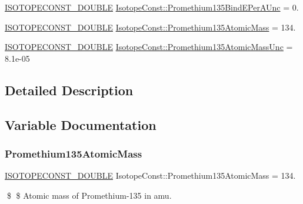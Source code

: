 \begin{DoxyCompactItemize}
\item 
\mbox{\hyperlink{group___isotope_const-_macros_ga8f45a7272ce02c0b4c65c44636ed719a}{I\+S\+O\+T\+O\+P\+E\+C\+O\+N\+S\+T\+\_\+\+D\+O\+U\+B\+LE}} \mbox{\hyperlink{group___isotope_const-_promethium-_pm135_gac7d0a56333d6a231e958581e6ab3c596}{Isotope\+Const\+::\+Promethium135\+Bind\+E\+Per\+A\+Unc}} = 0.
\item 
\mbox{\hyperlink{group___isotope_const-_macros_ga8f45a7272ce02c0b4c65c44636ed719a}{I\+S\+O\+T\+O\+P\+E\+C\+O\+N\+S\+T\+\_\+\+D\+O\+U\+B\+LE}} \mbox{\hyperlink{group___isotope_const-_promethium-_pm135_ga32e473388991b5d81122fc62445d90c1}{Isotope\+Const\+::\+Promethium135\+Atomic\+Mass}} = 134.
\item 
\mbox{\hyperlink{group___isotope_const-_macros_ga8f45a7272ce02c0b4c65c44636ed719a}{I\+S\+O\+T\+O\+P\+E\+C\+O\+N\+S\+T\+\_\+\+D\+O\+U\+B\+LE}} \mbox{\hyperlink{group___isotope_const-_promethium-_pm135_ga6296abb5a596edb933f86e9559ef9a0c}{Isotope\+Const\+::\+Promethium135\+Atomic\+Mass\+Unc}} = 8.\+1e-\/05
\end{DoxyCompactItemize}


\subsection{Detailed Description}


\subsection{Variable Documentation}
\mbox{\label{group___isotope_const-_promethium-_pm135_ga32e473388991b5d81122fc62445d90c1}} 
\subsubsection{\texorpdfstring{Promethium135\+Atomic\+Mass}{Promethium135AtomicMass}}
{\footnotesize\ttfamily \mbox{\hyperlink{group___isotope_const-_macros_ga8f45a7272ce02c0b4c65c44636ed719a}{I\+S\+O\+T\+O\+P\+E\+C\+O\+N\+S\+T\+\_\+\+D\+O\+U\+B\+LE}} Isotope\+Const\+::\+Promethium135\+Atomic\+Mass = 134.}

\$ \$ Atomic mass of Promethium-\/135 in amu. \mbox{\label{group___isotope_const-_promethium-_pm135_ga6296abb5a596edb933f86e9559ef9a0c}} 
